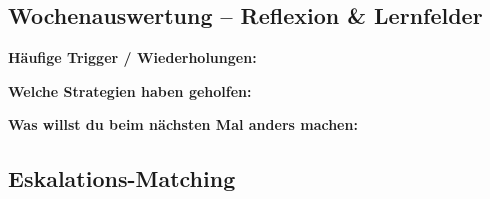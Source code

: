 \subsection*{\textcolor{ctmmGreen}{Wochenauswertung -- Reflexion \& Lernfelder}}

\begin{tcolorbox}[colback=ctmmGreen!5!white,colframe=ctmmGreen,title=Welche Muster wiederholen sich? Was willst du nächste Woche ausprobieren?]

\textbf{Häufige Trigger / Wiederholungen:}\\

\textbf{Welche Strategien haben geholfen:}\\

\textbf{Was willst du beim nächsten Mal anders machen:}\\

\end{tcolorbox}

\subsection*{\textcolor{ctmmRed}{Eskalations-Matching}}

